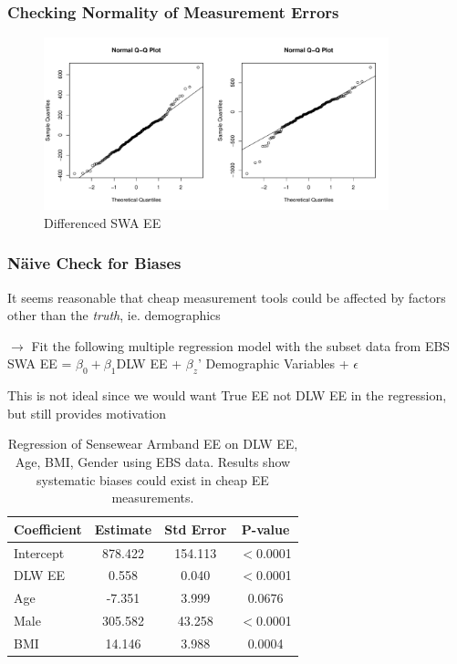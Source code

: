 \documentclass[handout]{beamer}\usepackage[]{graphicx}\usepackage[]{color}
\begin{document}
\begin{frame}
\frametitle{Checking Normality of Measurement Errors}


\begin{figure}
\centering
\includegraphics[width=10cm,height=5cm]{swa_qq.pdf}
\caption{Differenced SWA  EE }
\end{figure}


\end{frame}

\begin{frame}
\frametitle{N{\"a}ive Check for Biases}
It seems reasonable that cheap measurement tools could be affected by factors other than the \emph{truth}, ie. demographics \\

\vspace{0.3cm}

$\rightarrow$ Fit the following multiple regression model with the subset data from EBS\\
SWA EE = $\beta_0 + \beta_1$DLW EE + $\beta_z$' Demographic Variables + $\epsilon$ \\

\vspace{0.3cm}

This is not ideal since we would want True EE not DLW EE in the regression, but still provides motivation


\end{frame}

\begin{frame}

\begin{table} \centering 
  \caption{Regression of Sensewear Armband EE on DLW EE, Age, BMI, Gender using EBS data. Results show systematic biases could exist in cheap EE measurements.} 
\begin{tabular}{l|ccc}
\hline
Coefficient & Estimate & Std Error & P-value \\
\hline
Intercept & 878.422 & 154.113 & $<$0.0001 \\
DLW EE & 0.558 & 0.040 & $<$0.0001 \\
Age & -7.351 & 3.999 & 0.0676 \\
Male & 305.582 & 43.258 & $<$0.0001 \\
BMI & 14.146 & 3.988 & 0.0004 \\
\hline
\end{tabular} 
\end{table} 
\end{frame}
\end{document}

